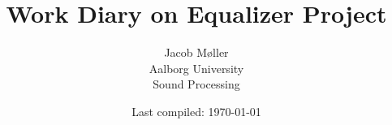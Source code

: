 




\title{Work Diary on Equalizer Project}
\author{Jacob Møller\\Aalborg University\\Sound Processing}
\date{Last compiled: \today}


  \pagestyle{empty}
  \maketitle
  \cleardoublepage
  \tableofcontents
  \cleardoublepage
  \listoftodos
  \cleardoublepage
  \pagestyle{fancy}
  
  
  \printbibliography[heading=bibintoc]
  \printindex*

